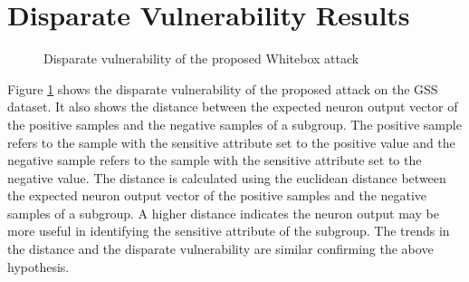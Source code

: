 \documentclass{article}
\begin{document}
\section{Disparate Vulnerability Results}
\begin{figure}[h]
    \centering
    \hfill
    \hfill
    \caption{Disparate vulnerability of the proposed Whitebox attack}
    \label{fig:disparate_vulnerability}
\end{figure}

Figure \ref{fig:disparate_vulnerability} shows the disparate vulnerability of the proposed attack on the GSS dataset.
It also shows the distance between the expected neuron output vector of the positive samples and the negative samples of a subgroup.
The positive sample refers to the sample with the sensitive attribute set to the positive value and the negative sample refers to the sample with the sensitive attribute set to the negative value.
The distance is calculated using the euclidean distance between the expected neuron output vector of the positive samples and the negative samples of a subgroup.
A higher distance indicates the neuron output may be more useful in identifying the sensitive attribute of the subgroup.
The trends in the distance and the disparate vulnerability are similar confirming the above hypothesis.
\end{document}
